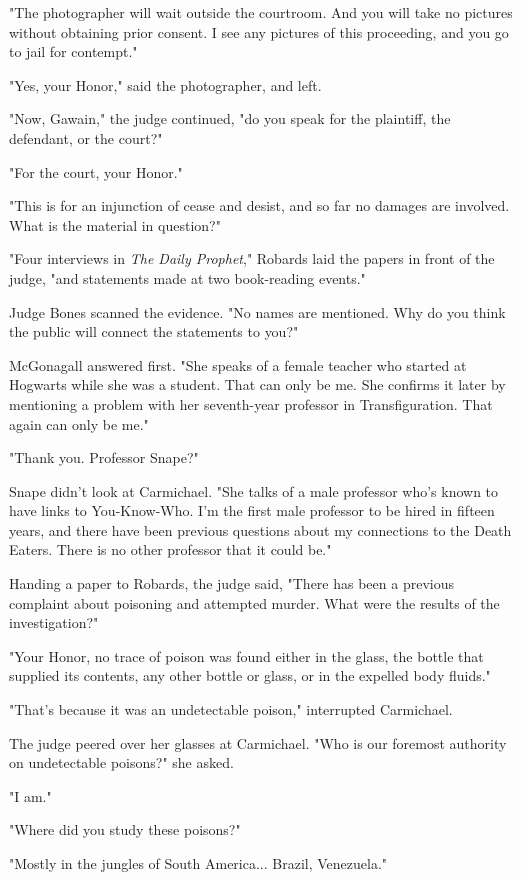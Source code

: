 \documentclass[a4paper,11pt]{article}
\begin{document}
"The photographer will wait outside the courtroom. And you will take no pictures without obtaining prior consent. I see any pictures of this proceeding, and you go to jail for contempt."

"Yes, your Honor," said the photographer, and left.

"Now, Gawain," the judge continued, "do you speak for the plaintiff, the defendant, or the court?"

"For the court, your Honor."

"This is for an injunction of cease and desist, and so far no damages are involved. What is the material in question?"

"Four interviews in \emph{The Daily Prophet}," Robards laid the papers in front of the judge, "and statements made at two book-reading events."

Judge Bones scanned the evidence. "No names are mentioned. Why do you think the public will connect the statements to you?"

McGonagall answered first. "She speaks of a female teacher who started at Hogwarts while she was a student. That can only be me. She confirms it later by mentioning a problem with her seventh-year professor in Transfiguration. That again can only be me."

"Thank you. Professor Snape?"

Snape didn't look at Carmichael. "She talks of a male professor who's known to have links to You-Know-Who. I'm the first male professor to be hired in fifteen years, and there have been previous questions about my connections to the Death Eaters. There is no other professor that it could be."

Handing a paper to Robards, the judge said, "There has been a previous complaint about poisoning and attempted murder. What were the results of the investigation?"

"Your Honor, no trace of poison was found either in the glass, the bottle that supplied its contents, any other bottle or glass, or in the expelled body fluids."

"That's because it was an undetectable poison," interrupted Carmichael.

The judge peered over her glasses at Carmichael. "Who is our foremost authority on undetectable poisons?" she asked.

"I am."

"Where did you study these poisons?"

"Mostly in the jungles of South America... Brazil, Venezuela."
\end{document}
